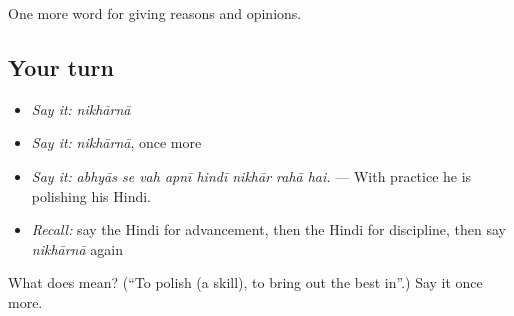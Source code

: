 \begin{grammarlens}[title={What you've built}]
One more word for giving reasons and opinions.
\end{grammarlens}

\subsection*{Your turn}
\begin{itemize}
\raggedright
  \item \emph{Say it:} \emph{nikhārnā}
  \item \emph{Say it:} \emph{nikhārnā}, once more
  \item \emph{Say it:} \emph{abhyās se vah apnī hindī nikhār rahā hai.} — With practice he is polishing his Hindi.
  \item \emph{Recall:} say the Hindi for advancement, then the Hindi for discipline, then say \emph{nikhārnā} again
\end{itemize}

\begin{tcolorbox}[breakable,colback=teal!4,colframe=teal!35!black,title={Before you move on}]
What does  mean? (\textquotedblleft{}To polish (a skill), to bring out the best in\textquotedblright{}.) Say it once more.
\end{tcolorbox}
